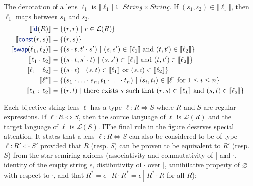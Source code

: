 \documentclass[acmsmall,review,anonymous]{acmart}
\newcommand{\kw}[1]{\textcolor{dkblue}{\ensuremath{\mathsf{#1}}}}
\newcommand{\sep}{\ensuremath{\ | \ }}
\newcommand{\const}{\ensuremath{\kw{const}}}
\newcommand{\swap}{\ensuremath{\kw{swap}}}
\newcommand{\id}{\ensuremath{\kw{id}}}
\begin{document}
The denotation of a lens $\ell_1$ is $\llbracket \ell_1 \rrbracket \subseteq
\mathit{String} \times \mathit{String}$. If $(s_1, s_2) \in \llbracket \ell_1
\rrbracket$, then $\ell_1$ maps between $s_1$ and $s_2$.
\begin{align*}
\llbracket \id(R) \rrbracket &= \{(r, r) \sep r \in \mathcal{L}(R)\}\\
\llbracket \const(r, s) \rrbracket &= \{(r, s)\}\\
\llbracket \swap(\ell_1, \ell_2) \rrbracket &= \{(s \cdot t, t' \cdot s') \sep
(s, s') \in \llbracket \ell_1 \rrbracket \text{ and } (t, t') \in \llbracket
\ell_2 \rrbracket\}\\
\llbracket \ell_1 \cdot \ell_2 \rrbracket &= \{(s \cdot t, s' \cdot t) \sep
(s, s') \in \llbracket \ell_1 \rrbracket \text{ and } (t, t') \in \llbracket
\ell_2 \rrbracket\}\\
\llbracket \ell_1 \sep \ell_2 \rrbracket &= \{(s \cdot t) \sep
(s, t) \in \llbracket \ell_1 \rrbracket \text{ or } (s, t) \in \llbracket
\ell_2 \rrbracket\}\\
\llbracket \ell^* \rrbracket &= \{(s_1 \cdot \ldots \cdot s_n, t_1 \cdot \ldots
\cdot t_n) \sep (s_i, t_i) \in \llbracket \ell \rrbracket \text{ for } 1
\leq i \leq n\}\\
\llbracket \ell_1 \; ; \; \ell_2 \rrbracket &= \{(r, t) \sep \text{there exists }s
\text{ such that } (r, s) \in \llbracket \ell_1 \rrbracket \text{ and } (s, t)
\in \llbracket \ell_2 \rrbracket\}
\end{align*}

Each bijective string lens $\ell$ has a type $\ell : R \Leftrightarrow S$ where
$R$ and $S$ are regular expressions. If $\ell : R \Leftrightarrow S$, then the
source language of $\ell$ is $\mathcal{L}(R)$ and the target language of $\ell$
is $\mathcal{L}(S)$. IThe final rule in the figure deserves special attention.
It states that a lens $\ell : R \Leftrightarrow S$ can also be considered to be
of type $\ell : R' \Leftrightarrow S'$ provided that $R$ (resp. $S$) can be
proven to be equivalent to $R'$ (resp. $S$) from the star-semiring axioms
(associativity and commutativity of | and $\cdot$, identity of the empty string
$\epsilon$, distibutivity of $\cdot$ over |, annihilative property of
$\varnothing$ with respect to $\cdot$, and that $R^* = \epsilon \; | \; R \cdot
R^* = \epsilon \; | \; R^* \cdot R$ for all $R$):

\begin{prooftree}
\end{prooftree}
\end{document}
